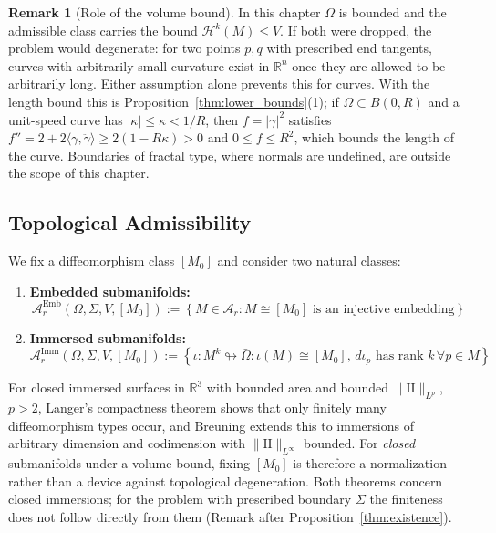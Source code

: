 \documentclass[11pt,reqno]{amsart}
\theoremstyle{definition}
\newtheorem{remark}[theorem]{Remark}
\providecommand{\R}{\mathbb{R}}
\providecommand{\II}{\mathrm{I\!I}}
\providecommand{\Hsn}{\mathcal{H}}
\numberwithin{equation}{section}
\providecommand{\II}{\mathrm{II}}
\providecommand{\R}{\mathbb{R}}
\providecommand{\Hsn}{\mathcal{H}}
\begin{document}
\begin{remark}[Role of the volume bound]
\label{rem:compactness_necessity}
In this chapter $\Omega$ is bounded and the admissible class carries the bound $\Hsn^k(M) \le V$. If both were dropped, the problem would degenerate: for two points $p, q$ with prescribed end tangents, curves with arbitrarily small curvature exist in $\R^n$ once they are allowed to be arbitrarily long. Either assumption alone prevents this for curves. With the length bound this is Proposition~\ref{thm:lower_bounds}(1); if $\Omega \subset B(0,R)$ and a unit-speed curve has $|\kappa| \le \kappa < 1/R$, then $f = |\gamma|^2$ satisfies $f'' = 2 + 2\langle\gamma,\ddot\gamma\rangle \ge 2(1 - R\kappa) > 0$ and $0 \le f \le R^2$, which bounds the length of the curve. Boundaries of fractal type, where normals are undefined, are outside the scope of this chapter.
\end{remark}

\subsection{Topological Admissibility}
\label{subsec:embeddings_vs_immersions}
We fix a diffeomorphism class $[M_0]$ and consider two natural classes:
\begin{enumerate}
    \item \textbf{Embedded submanifolds:}
    \begin{equation}
    \mathcal{A}_r^{\mathrm{Emb}}(\Omega, \Sigma, V, [M_0]) := \left\{ M \in \mathcal{A}_r : M \cong [M_0] \text{ is an injective embedding} \right\}
    \end{equation}
    \item \textbf{Immersed submanifolds:}
    \begin{equation}
    \mathcal{A}_r^{\mathrm{Imm}}(\Omega, \Sigma, V, [M_0]) := \left\{ \iota: M^k \looparrowright \bar{\Omega} : \iota(M) \cong [M_0], \, d\iota_p \text{ has rank } k \, \forall p \in M \right\}
    \end{equation}
\end{enumerate}
For closed immersed surfaces in $\R^3$ with bounded area and bounded $\|\II\|_{L^p}$, $p > 2$, Langer's compactness theorem \cite{langer1985} shows that only finitely many diffeomorphism types occur, and Breuning \cite{breuning2015} extends this to immersions of arbitrary dimension and codimension with $\|\II\|_{L^\infty}$ bounded. For \emph{closed} submanifolds under a volume bound, fixing $[M_0]$ is therefore a normalization rather than a device against topological degeneration. Both theorems concern closed immersions; for the problem with prescribed boundary $\Sigma$ the finiteness does not follow directly from them (Remark after Proposition~\ref{thm:existence}).
\end{document}
